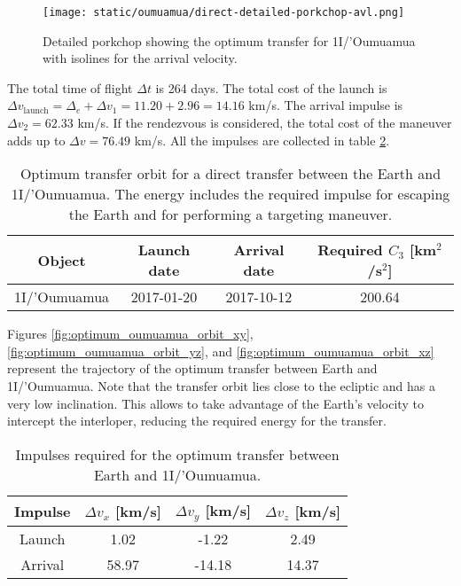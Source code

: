\begin{figure}[H]
  \centering
  \texttt{[image: static/oumuamua/direct-detailed-porkchop-avl.png]}
  \caption[Detailed porkchop showing the optimum transfer for
    1I/'Oumuamua with the arrival velocity.]{Detailed porkchop showing the
    optimum transfer for 1I/'Oumuamua with isolines for the arrival
    velocity.}
  \label{fig:oumuamua-optimum-porkchop-avl}
\end{figure}

The total time of flight $\Delta t$ is 264 days. The total cost of the launch is
$\Delta v_\text{launch} = \Delta_e + \Delta v_1 = 11.20 + 2.96 = 14.16$ km/s.
The arrival impulse is $\Delta v_2 = 62.33$ km/s. If the rendezvous is
considered, the total cost of the maneuver adds up to $\Delta v = 76.49$ km/s.
All the impulses are collected in table
\ref{tab:oumuamua-direct-transfer-impulses}.

\vspace{1cm}
\begin{table}[H]
  \centering
  \begin{tabular}{|c|c|c|c|}
    \hline
    Object       & Launch date & Arrival date & Required $C_3$ [km$^2$/s$^2$] \\
    \hline
    1I/'Oumuamua & 2017-01-20  & 2017-10-12   & 200.64                        \\
    \hline
  \end{tabular}
  \caption[Optimum transfer orbit for a direct transfer between the Earth and
    1I/'Oumuamua.]{Optimum transfer orbit for a direct transfer between the
    Earth and 1I/'Oumuamua. The energy includes the required impulse for
    escaping the Earth and for performing a targeting maneuver.}
  \label{tab:oumuamua-direct-transfer-optimum}
\end{table}

Figures \ref{fig:optimum_oumuamua_orbit_xy},
\ref{fig:optimum_oumuamua_orbit_yz}, and \ref{fig:optimum_oumuamua_orbit_xz}
represent the trajectory of the optimum transfer between Earth and 1I/'Oumuamua.
Note that the transfer orbit lies close to the ecliptic and has a very low
inclination. This allows to take advantage of the Earth's velocity to intercept
the interloper, reducing the required energy for the transfer.

\vspace{1cm}
\begin{table}[H]
  \centering
  \begin{tabular}{|c|c|c|c|}
    \hline
    Impulse & $\Delta v_x$ [km/s] & $\Delta v_y$ [km/s] & $\Delta v_z$ [km/s] \\
    \hline
    Launch  & 1.02                & -1.22               & 2.49                \\
    \hline
    Arrival & 58.97               & -14.18              & 14.37               \\
    \hline
  \end{tabular}
  \caption{Impulses required for the optimum transfer between Earth and 1I/'Oumuamua.}
  \label{tab:oumuamua-direct-transfer-impulses}
\end{table}

